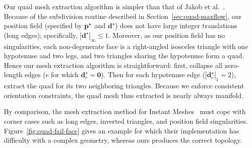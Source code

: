Our quad mesh extraction algorithm is simpler than that of Jakob et al.~\cite{jakob2015instant}. Because of the subdivision routine described in Section~\ref{sec:quad-maxflow}, our position field (specified by $\mathbf{p}^{\star}$ and ${\textbf{d}}^{\star}$) does not have large integer translations (long edges); specifically, $|{\textbf{d}}^{\star}|_{\infty} \leq 1$. Moreover, as our position field has no singularities, each non-degenerate face is a right-angled isosceles triangle with one hypotenuse and two legs, and two triangles sharing the hypotenuse form a quad.  Hence our mesh extraction algorithm is straightforward: first, collapse all zero-length edges ($e$ for which ${\textbf{d}}_e^{\star} = \textbf{0}$). Then for each hypotenuse edge ($|{\textbf{d}}_e^{\star}|_1 = 2$), extract the quad for its two neighboring triangles. Because we enforce consistent orientation constraints, the quad mesh thus extracted is nearly always manifold. %

By comparison, the mesh extraction method for Instant Meshes~\cite{jakob2015instant} must cope with corner cases such as long edges, inverted triangles, and position field singularities. Figure~\ref{fig:quad-fail-face} gives an example for which their implementation has difficulty with a complex geometry, whereas ours produces the correct topology.

